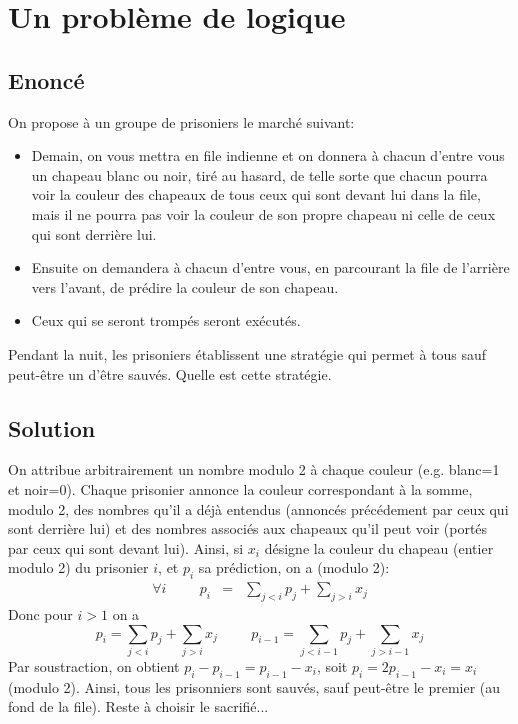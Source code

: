 \documentclass{article}
\begin{document}
\section{Un problème de logique}

\subsection{Enoncé}
On propose à un groupe de prisoniers le marché suivant:
\begin{itemize}
\item
Demain, on vous mettra en file indienne et on donnera à chacun d'entre vous un chapeau blanc ou noir, tiré au hasard, de telle sorte que chacun pourra voir la couleur des chapeaux de tous ceux qui sont devant lui dans la file, mais il ne pourra pas voir la couleur de son propre chapeau ni celle de ceux qui sont derrière lui.
\item
Ensuite on demandera à chacun d'entre vous, en parcourant la file de l'arrière vers l'avant, de prédire la couleur de son chapeau.
\item
Ceux qui se seront trompés seront exécutés.
\end{itemize}
Pendant la nuit, les prisoniers établissent une stratégie qui permet à tous sauf peut-être un d'être sauvés. Quelle est cette stratégie.
\subsection{Solution}
On attribue arbitrairement un nombre modulo 2 à chaque couleur (e.g. blanc=1 et noir=0). Chaque prisonier annonce la couleur correspondant à la somme, modulo 2, des nombres qu'il a déjà entendus (annoncés précédement par ceux qui sont derrière lui) et des nombres associés aux chapeaux qu'il peut voir (portés par ceux qui sont devant lui). Ainsi, si $x_i$ désigne la couleur du chapeau (entier modulo 2) du prisonier $i$, et $p_i$ sa prédiction, on a (modulo 2):
\begin{eqnarray*}
\forall i\hspace{1cm}p_i & = & \sum_{j<i}p_j+\sum_{j>i}x_j
\end{eqnarray*}
Donc pour $i>1$ on a
\[
p_i = \sum_{j<i}p_j+\sum_{j>i}x_j
\hspace{1cm}
p_{i-1} = \sum_{j<i-1}p_j+\sum_{j>i-1}x_j
\]
Par soustraction, on obtient $p_i-p_{i-1}=p_{i-1}-x_i$, soit $p_i=2p_{i-1}-x_i=x_i$ (modulo 2). Ainsi, tous les prisonniers sont sauvés, sauf peut-être le premier (au fond de la file). Reste à choisir le sacrifié...
\pagebreak
\end{document}

